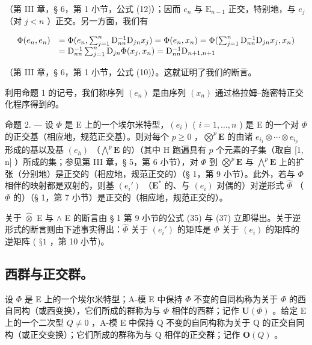 （第 III 章，§ 6，第 1 小节，公式 (12)）；因而 \(e_n\) 与 \(\mathrm{E}_{n-1}\) 正交，特别地，与 \(e_j\) （对 \(j < n\) ）正交。另一方面，我们有

\[
\begin{array}{r l} \Phi (e _ {n}, e _ {n}) & = \Phi (e _ {n}, \sum_ {j = 1} ^ {n} \mathrm{D} _ {n n} ^ {- 1} \mathrm{D} _ {j n} x _ {j}) = \Phi (e _ {n}, x _ {n}) = \Phi (\sum_ {j = 1} ^ {n} \mathrm{D} _ {n n} ^ {- 1} \mathrm{D} _ {j n} x _ {j}, x _ {n}) \\ & = \mathrm{D} _ {n n} ^ {- 1} \sum_ {j = 1} ^ {n} \mathrm{D} _ {j n} \Phi (x _ {j}, x _ {n}) = \mathrm{D} _ {n n} ^ {- 1} \mathrm{D} _ {n + 1, n + 1} \end{array}
\]

（第 III 章，§ 6，第 1 小节，公式 (10)）。这就证明了我们的断言。

利用命题 1 的记号，我们称序列 \((e_n)\) 是由序列 \((x_n)\) 通过格拉姆–施密特正交化程序得到的。

命题 2. --- 设 \(\Phi\) 是 E 上的一个埃尔米特型，\((e_i)\) ( \(i = 1, \ldots, n\) ) 是 E 的一个对 \(\Phi\) 的正交基（相应地，规范正交基）。则对每个 \(p \geqslant 0\) ，\(\bigotimes^{p} \mathbf{E}\) 的由诸 \(e_{i_1} \otimes \cdots \otimes e_{i_p}\) 形成的基以及基 \((e_h)\) （\(\bigwedge^{p} \mathbf{E}\) 的）（其中 H 跑遍具有 \(p\) 个元素的子集（取自 {[}1, n{]} ）所成的集；参见第 III 章，§ 5，第 6 小节），对 \(\Phi\) 到 \(\bigotimes^{p} \mathbf{E}\) 与 \(\bigwedge^{p} \mathbf{E}\) 上的扩张（分别地）是正交的（相应地，规范正交的）（§ 1，第 9 小节）。此外，若与 \(\Phi\) 相伴的映射都是双射的，则基 \((e_i')\) （\(\mathbf{E}^*\) 的、与 \((e_i)\) 对偶的）对逆形式 \(\hat{\Phi}\) （\(\Phi\) 的）（§ 1，第 7 小节）是正交的（相应地，规范正交的）。

关于 \(\widehat{\otimes}\) E 与 \(\wedge\) E 的断言由 § 1 第 9 小节的公式 (35) 与 (37) 立即得出。关于逆形式的断言则由下述事实得出：\(\widehat{\Phi}\) 关于 \((e_i')\) 的矩阵是 \(\Phi\) 关于 \((e_i)\) 的矩阵的逆矩阵 ( \(§ 1\) ，第 10 小节)。

\subsection{西群与正交群。}

设 \(\Phi\) 是 E 上的一个埃尔米特型；A-模 E 中保持 \(\Phi\) 不变的自同构称为关于 \(\Phi\) 的西自同构（或西变换），它们所成的群称为与 \(\Phi\) 相伴的西群；记作 \(\mathbf{U}(\Phi)\) 。给定 E 上的一个二次型 \(Q \neq 0\) ，A-模 E 中保持 Q 不变的自同构称为关于 Q 的正交自同构（或正交变换）；它们所成的群称为与 Q 相伴的正交群；记作 \(\mathbf{O}(Q)\) 。

